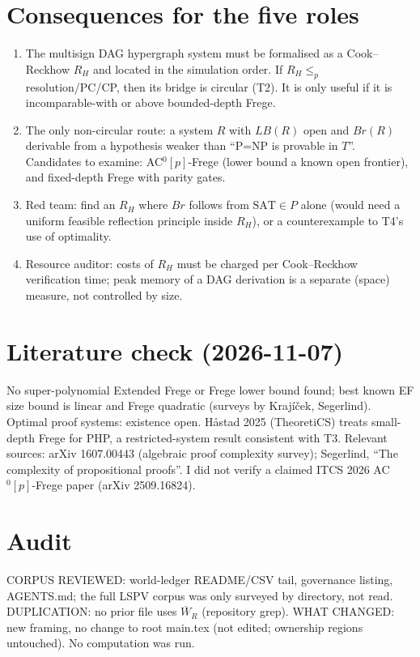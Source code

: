 \documentclass{article}\usepackage{amsmath,amssymb,amsthm}
\newcommand{\W}{\overline W}
\begin{document}
\section*{Consequences for the five roles}
\begin{enumerate}
\item The multisign DAG hypergraph system must be formalised as a Cook--Reckhow $R_H$ and located in the simulation order. If $R_H\le_p$ resolution/PC/CP, then its bridge is circular (T2). It is only useful if it is incomparable-with or above bounded-depth Frege.
\item The only non-circular route: a system $R$ with $LB(R)$ open and $Br(R)$ derivable from a hypothesis weaker than ``P=NP is provable in $T$''. Candidates to examine: AC$^0[p]$-Frege (lower bound a known open frontier), and fixed-depth Frege with parity gates.
\item Red team: find an $R_H$ where $Br$ follows from $\mathrm{SAT}\in P$ alone (would need a uniform feasible reflection principle inside $R_H$), or a counterexample to T4's use of optimality.
\item Resource auditor: costs of $R_H$ must be charged per Cook--Reckhow verification time; peak memory of a DAG derivation is a separate (space) measure, not controlled by size.
\end{enumerate}

\section*{Literature check (2026-11-07)}
No super-polynomial Extended Frege or Frege lower bound found; best known EF size bound is linear and Frege quadratic (surveys by Krajíček, Segerlind). Optimal proof systems: existence open. Håstad 2025 (TheoretiCS) treats small-depth Frege for PHP, a restricted-system result consistent with T3. Relevant sources: arXiv 1607.00443 (algebraic proof complexity survey); Segerlind, ``The complexity of propositional proofs''. I did not verify a claimed ITCS 2026 AC$^0[p]$-Frege paper (arXiv 2509.16824).

\section*{Audit}
CORPUS REVIEWED: world-ledger README/CSV tail, governance listing, AGENTS.md; the full LSPV corpus was only surveyed by directory, not read. DUPLICATION: no prior file uses $\W_R$ (repository grep). WHAT CHANGED: new framing, no change to root main.tex (not edited; ownership regions untouched). No computation was run.

\end{document}
